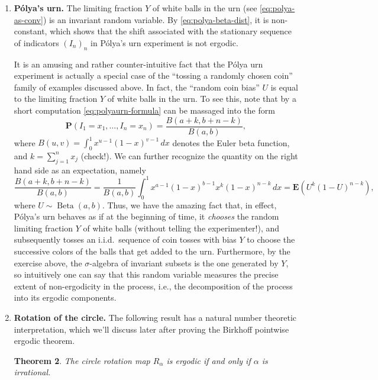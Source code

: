 \documentclass[12pt]{article}
\newtheorem{thm}{Theorem}[section]
\newtheorem{exercise}[thm]{Exercise}
\newcommand{\prob}{\mathbf{P}}
\newcommand{\expec}{\mathbf{E}}
\theoremstyle{example}
\begin{document}
\begin{enumerate}[1.]
\begin{exercise}
Show that the $\sigma$-algebra $\mathcal{I}$ of invariant subsets for this process coincides with the $\sigma$-algebra $\sigma(U)$ generated by the random coin bias $U$. That means that, not only is $U$ an invariant random variable, but any other invariant random variable can be computed once the value of $U$ is known.
\end{exercise}

\item \textbf{P\'olya's urn.} The limiting fraction $Y$ of white balls in the urn (see \eqref{eq:polya-as-conv}) is an invariant random variable. By \eqref{eq:polya-beta-dist}, it is non-constant, which shows that the shift associated  with the stationary sequence of indicators $(I_n)_n$ in P\'olya's urn experiment is not ergodic.

It is an amusing and rather counter-intuitive fact that the P\'olya urn experiment is actually a special case of the ``tossing a randomly chosen coin'' family of examples discussed above. In fact, the ``random coin bias'' $U$ is equal to the limiting fraction $Y$ of white balls in the urn. To see this, note that by a short computation \eqref{eq:polyaurn-formula} can be massaged into the form
$$ \prob(I_1=x_1, \ldots, I_n=x_n) = \frac{B(a+k, b+n-k)}{B(a,b)}, $$
where $B(u,v)=\int_0^1 x^{u-1}(1-x)^{v-1}\,dx$ denotes the Euler beta function, and $k=\sum_{j=1}^n x_j$ (check!). We can further recognize the quantity on the right hand side as an expectation, namely
$$ \frac{B(a+k, b+n-k)}{B(a,b)}= \frac{1}{B(a,b)}\int_0^1 x^{a-1}(1-x)^{b-1} x^k(1-x)^{n-k}\,dx = \expec(U^k(1-U)^{n-k}), $$
where $U\sim \operatorname{Beta}(a,b)$. Thus, we have the amazing fact that, in effect, P\'olya's urn behaves as if at the beginning of time, it \emph{chooses} the random limiting fraction $Y$ of white balls (without telling the experimenter!), and subsequently tosses an i.i.d.\ sequence of coin tosses with bias $Y$ to choose the successive colors of the balls that get added to the urn. Furthermore, by the exercise above, the $\sigma$-algebra of invariant subsets is the one generated by $Y$, so intuitively one can say that this random variable measures the precise extent of non-ergodicity in the process, i.e., the decomposition of the process into its ergodic components.

\item \textbf{Rotation of the circle.} The following result has a natural number theoretic interpretation, which we'll discuss later after proving the Birkhoff pointwise ergodic theorem.
\begin{thm} The circle rotation map $R_\alpha$ is ergodic if and only if $\alpha$ is irrational.
\end{thm}


\end{enumerate}
\end{document}
